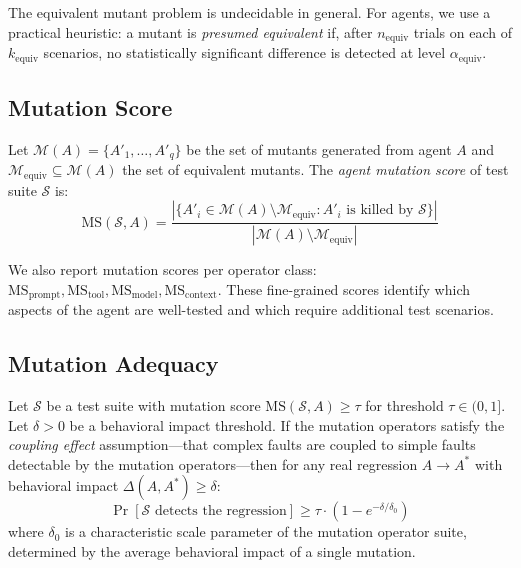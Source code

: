 The equivalent mutant problem is undecidable in general. For agents, we
use a practical heuristic: a mutant is \emph{presumed equivalent} if,
after $n_{\text{equiv}}$ trials on each of $k_{\text{equiv}}$ scenarios,
no statistically significant difference is detected at level
$\alpha_{\text{equiv}}$.

\subsection{Mutation Score}
\label{sec:mutation:score}

\begin{definition}
\label{def:mutation-score}
Let $\mathcal{M}(A) = \{A'_1, \ldots, A'_q\}$ be the set of mutants
generated from agent $A$ and $\mathcal{M}_{\text{equiv}} \subseteq
\mathcal{M}(A)$ the set of equivalent mutants. The \emph{agent mutation
score} of test suite $\mathcal{S}$ is:
\begin{equation}
\label{eq:mutation-score}
  \text{MS}(\mathcal{S}, A) =
    \frac{|\{A'_i \in \mathcal{M}(A) \setminus \mathcal{M}_{\text{equiv}}
      : A'_i \text{ is killed by } \mathcal{S}\}|}
         {|\mathcal{M}(A) \setminus \mathcal{M}_{\text{equiv}}|}
\end{equation}
\end{definition}

\begin{remark}
We also report mutation scores per operator class:
$\text{MS}_{\text{prompt}}, \text{MS}_{\text{tool}},
\text{MS}_{\text{model}}, \text{MS}_{\text{context}}$. These
fine-grained scores identify which aspects of the agent are well-tested
and which require additional test scenarios.
\end{remark}

\subsection{Mutation Adequacy}
\label{sec:mutation:adequacy}

\begin{theorem}
\label{thm:mutation-adequacy}
Let $\mathcal{S}$ be a test suite with mutation score
$\text{MS}(\mathcal{S}, A) \geq \tau$ for threshold $\tau \in (0, 1]$.
Let $\delta > 0$ be a behavioral impact threshold. If the mutation
operators satisfy the \emph{coupling effect} assumption---that complex
faults are coupled to simple faults detectable by the mutation
operators---then for any real regression $A \to A^*$ with behavioral
impact $\Delta(A, A^*) \geq \delta$:
\begin{equation}
\label{eq:adequacy-bound}
  \Pr[\mathcal{S} \text{ detects the regression}] \geq
    \tau \cdot \left(1 - e^{-\delta / \delta_0}\right)
\end{equation}
where $\delta_0$ is a characteristic scale parameter of the mutation
operator suite, determined by the average behavioral impact of a single
mutation.
\end{theorem}

